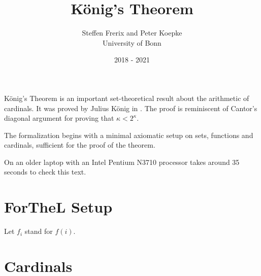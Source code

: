 \documentclass[english]{article}
\title{König's Theorem}
\author{Steffen Frerix and Peter Koepke\\
University of Bonn}
\date{2018 - 2021}
\begin{document}
\maketitle

König's Theorem is an important set-theoretical result about the arithmetic of
cardinals.
It was proved by Julius König in \cite{Koenig1905}.
The proof is reminiscent of Cantor's diagonal argument for proving that $\kappa
< 2^\kappa$.

The formalization begins with a minimal axiomatic setup on sets, functions and
cardinals, sufficient for the proof of the theorem.

On an older laptop with an Intel Pentium N3710 processor \Naproche takes around
35 seconds to check this text.


\section{ForTheL Setup}

\begin{forthel}

  Let $f_{i}$ stand for $f(i)$.
\end{forthel}


\section{Cardinals}
\end{document}
